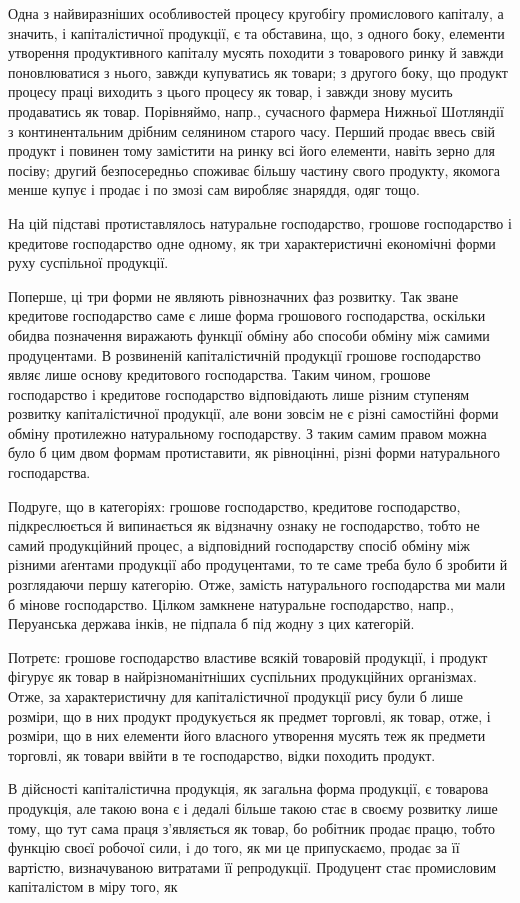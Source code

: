 
Одна з найвиразніших особливостей процесу кругобігу промислового
капіталу, а значить, і капіталістичної продукції, є та обставина, що, з
одного боку, елементи утворення продуктивного капіталу мусять походити
з товарового ринку й завжди поновлюватися з нього, завжди купуватись
як товари; з другого боку, що продукт процесу праці виходить з
цього процесу як товар, і завжди знову мусить продаватись як товар.
Порівняймо, напр., сучасного фармера Нижньої Шотляндії з континентальним
дрібним селянином старого часу. Перший продає ввесь свій
продукт і повинен тому замістити на ринку всі його елементи, навіть
зерно для посіву; другий безпосередньо споживає більшу частину свого
продукту, якомога менше купує і продає і по змозі сам виробляє знаряддя,
одяг тощо.

На цій підставі протиставлялось натуральне господарство, грошове
господарство і кредитове господарство одне одному, як три характеристичні
економічні форми руху суспільної продукції.

Поперше, ці три форми не являють рівнозначних фаз розвитку. Так
зване кредитове господарство саме є лише форма грошового господарства,
оскільки обидва позначення виражають функції обміну або способи
обміну між самими продуцентами. В розвиненій капіталістичній продукції
грошове господарство являє лише основу кредитового господарства.
Таким чином, грошове господарство і кредитове господарство відповідають
лише різним ступеням розвитку капіталістичної продукції, але
вони зовсім не є різні самостійні форми обміну протилежно натуральному
господарству. З таким самим правом можна було б цим двом формам
протиставити, як рівноцінні, різні форми натурального господарства.

Подруге, що в категоріях: грошове господарство, кредитове господарство,
підкреслюється й випинається як відзначну ознаку не господарство,
тобто не самий продукційний процес, а відповідний господарству спосіб
обміну між різними аґентами продукції або продуцентами, то те саме
треба було б зробити й розглядаючи першу категорію. Отже, замість
натурального господарства ми мали б мінове господарство. Цілком замкнене
натуральне господарство, напр., Перуанська держава інків, не підпала
б під жодну з цих категорій.

Потретє: грошове господарство властиве всякій товаровій продукції, і
продукт фігурує як товар в найрізноманітніших суспільних продукційних
організмах. Отже, за характеристичну для капіталістичної продукції рису
були б лише розміри, що в них продукт продукується як предмет торговлі,
як товар, отже, і розміри, що в них елементи його власного утворення
мусять теж як предмети торговлі, як товари ввійти в те господарство,
відки походить продукт.

В дійсності капіталістична продукція, як загальна форма продукції,
є товарова продукція, але такою вона є і дедалі більше такою стає в
своєму розвитку лише тому, що тут сама праця з’являється як товар, бо
робітник продає працю, тобто функцію своєї робочої сили, і до того, як
ми це припускаємо, продає за її вартістю, визначуваною витратами її
репродукції. Продуцент стає промисловим капіталістом в міру того, як
\parbreak{}  %
